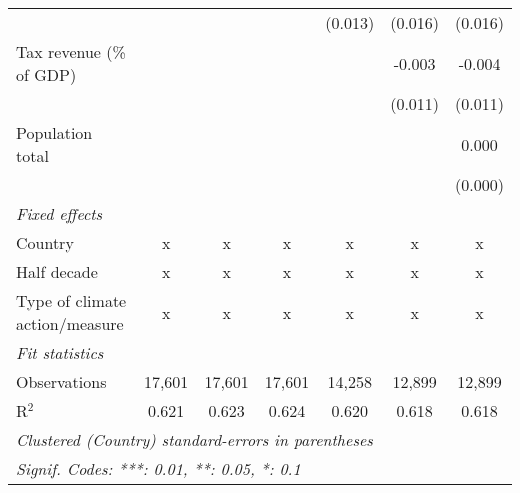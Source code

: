 \begin{tabular}{lcccccc}
                                                        &         &               &               & (0.013)       & (0.016)       & (0.016)\\   
   Tax revenue (\% of GDP)                              &         &               &               &               & -0.003        & -0.004\\   
                                                        &         &               &               &               & (0.011)       & (0.011)\\   
   Population total                                     &         &               &               &               &               & 0.000\\   
                                                        &         &               &               &               &               & (0.000)\\   
   \emph{Fixed effects}\\
   Country                                              & x       & x             & x             & x             & x             & x\\  
   Half decade                                          & x       & x             & x             & x             & x             & x\\  
   Type of climate action/measure                       & x       & x             & x             & x             & x             & x\\  
   \midrule \emph{Fit statistics}\\
   Observations                                         & 17,601  & 17,601        & 17,601        & 14,258        & 12,899        & 12,899\\  
   R$^2$                                                & 0.621   & 0.623         & 0.624         & 0.620         & 0.618         & 0.618\\  
   \midrule
   \multicolumn{7}{l}{\emph{Clustered (Country) standard-errors in parentheses}}\\
   \multicolumn{7}{l}{\emph{Signif. Codes: ***: 0.01, **: 0.05, *: 0.1}}\\
\end{tabular}
\par\endgroup


